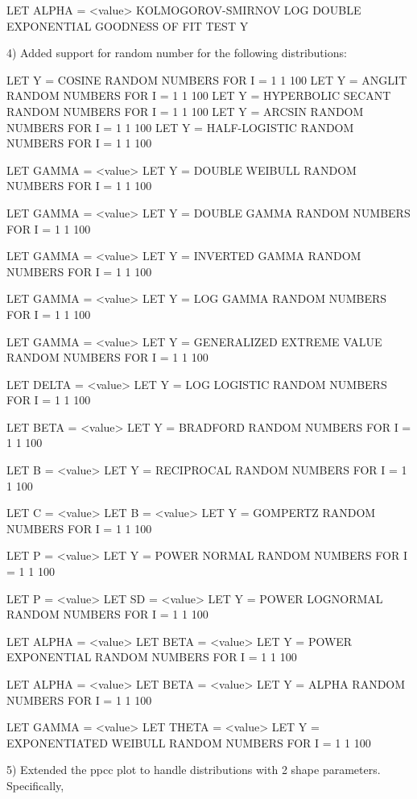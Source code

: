 {       LET ALPHA = <value>
       KOLMOGOROV-SMIRNOV LOG DOUBLE EXPONENTIAL GOODNESS OF FIT TEST Y

 4) Added support for random number for the following distributions:

       LET Y = COSINE RANDOM NUMBERS FOR I = 1 1 100
       LET Y = ANGLIT RANDOM NUMBERS FOR I = 1 1 100
       LET Y = HYPERBOLIC SECANT RANDOM NUMBERS FOR I = 1 1 100
       LET Y = ARCSIN RANDOM NUMBERS FOR I = 1 1 100
       LET Y = HALF-LOGISTIC RANDOM NUMBERS FOR I = 1 1 100

       LET GAMMA = <value>
       LET Y = DOUBLE WEIBULL RANDOM NUMBERS FOR I = 1 1 100

       LET GAMMA = <value>
       LET Y = DOUBLE GAMMA RANDOM NUMBERS FOR I = 1 1 100

       LET GAMMA = <value>
       LET Y = INVERTED GAMMA RANDOM NUMBERS FOR I = 1 1 100

       LET GAMMA = <value>
       LET Y = LOG GAMMA RANDOM NUMBERS FOR I = 1 1 100

       LET GAMMA = <value>
       LET Y = GENERALIZED EXTREME VALUE RANDOM NUMBERS FOR I = 1 1 100

       LET DELTA = <value>
       LET Y = LOG LOGISTIC RANDOM NUMBERS FOR I = 1 1 100

       LET BETA = <value>
       LET Y = BRADFORD RANDOM NUMBERS FOR I = 1 1 100

       LET B = <value>
       LET Y = RECIPROCAL RANDOM NUMBERS FOR I = 1 1 100

       LET C = <value>
       LET B = <value>
       LET Y = GOMPERTZ RANDOM NUMBERS FOR I = 1 1 100

       LET P = <value>
       LET Y = POWER NORMAL RANDOM NUMBERS FOR I = 1 1 100

       LET P = <value>
       LET SD = <value>
       LET Y = POWER LOGNORMAL RANDOM NUMBERS FOR I = 1 1 100

       LET ALPHA = <value>
       LET BETA = <value>
       LET Y = POWER EXPONENTIAL RANDOM NUMBERS FOR I = 1 1 100

       LET ALPHA = <value>
       LET BETA = <value>
       LET Y = ALPHA RANDOM NUMBERS FOR I = 1 1 100

       LET GAMMA = <value>
       LET THETA = <value>
       LET Y = EXPONENTIATED WEIBULL RANDOM NUMBERS FOR I = 1 1 100

 5) Extended the ppcc plot to handle distributions with 2
    shape parameters.  Specifically,

}
